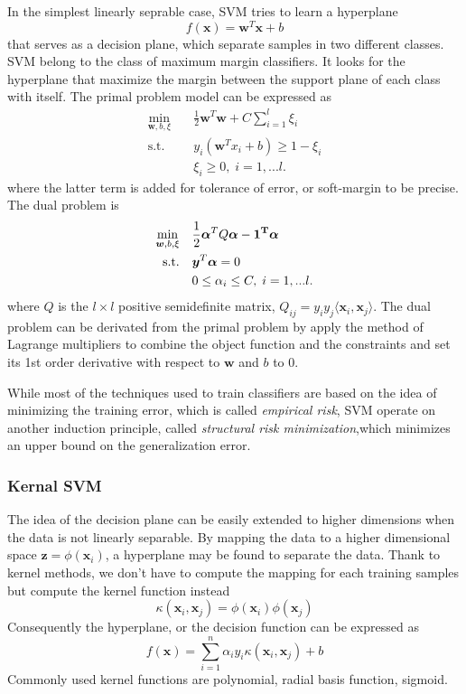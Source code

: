\documentclass[conference]{IEEEtran}
\begin{document}
In the simplest linearly seprable case, SVM tries to learn a hyperplane
\begin{equation}
	f(\bm{x})=\bm{w}^T\bm{x}+b
\end{equation}
that serves as a decision plane, which separate samples in two different classes. SVM belong to the class of maximum margin classifiers\cite{heisele2001face}. It looks for the hyperplane that maximize the margin between the support plane of each class with itself. The primal problem model can be expressed as
\begin{equation}
	\begin{split}
		\min_{\bm{w},b,\xi} \quad  &  \frac{1}{2}\bm{w}^T\bm{w}+C\sum_{i=1}^{l}\xi_i \\
		\textrm{s.t.} \quad & y_i(\bm{w}^Tx_i+b)\geq 1-\xi_i \\
		& \xi_i \geq 0,\; i=1,...l.
	\end{split}
\end{equation}
where the latter term is added for tolerance of error, or soft-margin to be precise\cite{chang2011libsvm}. The dual problem is
\begin{equation}
	\begin{split}
		\min_{\bm{w},b,\xi} \quad  &  \frac{1}{2}\bm{\alpha}^TQ\bm{\alpha}-\bf{1}^T\bm{\alpha} \\
		\textrm{s.t.} \quad & \bm{y}^T\bm{\alpha}=0 \\
		& 0 \leq \alpha_i \leq C,\; i=1,...l.
	\end{split}
\end{equation}
where $Q$ is the $l\times l$ positive semidefinite matrix, $Q_{ij}=y_iy_j\langle\bm{x}_i,\bm{x}_j\rangle$. The dual problem can be derivated from the primal problem by apply the method of Lagrange multipliers to combine the object function and the constraints and set its 1st order derivative with respect to $\bm{w}$ and $b$ to 0.

While most of the techniques used to train classifiers are based on the idea of minimizing the training error, which is called \textit{empirical risk}, SVM operate on another induction principle, called \textit{structural risk minimization},which minimizes an upper bound on the generalization error.
\subsubsection{Kernal SVM}
The idea of the decision plane can be easily extended to higher dimensions when the data is not linearly separable. By mapping the data to a higher dimensional space $\bm{z}=\phi(\bm{x}_i)$, a hyperplane may be found to separate the data. Thank to kernel methods, we don't have to compute the mapping for each training samples but compute the kernel function instead
\begin{equation}
	\kappa(\bm{x}_i,\bm{x}_j)=\phi(\bm{x}_i)\phi(\bm{x}_j)
\end{equation}
Consequently the hyperplane, or the decision function can be expressed as 
\begin{equation}
	f(\bm{x})= \sum_{i=1}^{n}\alpha_iy_i\kappa(\bm{x}_i,\bm{x}_j)+b
\end{equation}
Commonly used kernel functions are polynomial, radial basis function, sigmoid. 
\end{document}
